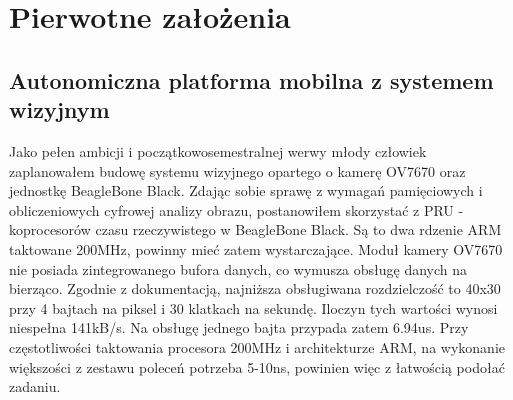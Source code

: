 \documentclass[a4paper]{article}
\begin{document}

\section{Pierwotne założenia}
\subsection{Autonomiczna platforma mobilna z systemem wizyjnym}
Jako pełen ambicji i początkowosemestralnej werwy młody człowiek zaplanowałem budowę systemu wizyjnego opartego o kamerę OV7670 oraz jednostkę BeagleBone Black. Zdając sobie sprawę z wymagań pamięciowych i obliczeniowych cyfrowej analizy obrazu, postanowiłem skorzystać z PRU - koprocesorów czasu rzeczywistego w BeagleBone Black. Są to dwa rdzenie ARM taktowane 200MHz, powinny mieć zatem wystarczające. Moduł kamery OV7670 nie posiada zintegrowanego bufora danych, co wymusza obsługę danych na bierząco. Zgodnie z dokumentacją, najniższa obsługiwana rozdzielczość to 40x30 przy 4 bajtach na piksel i 30 klatkach na sekundę. Iloczyn tych wartości wynosi niespełna 141kB/s. Na obsługę jednego bajta przypada zatem 6.94us. Przy częstotliwości taktowania procesora 200MHz i architekturze ARM, na wykonanie większości z zestawu poleceń potrzeba 5-10ns, powinien więc z łatwością podołać zadaniu.
\end{document}
